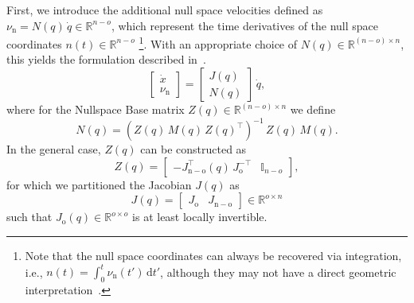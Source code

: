 First, we introduce the additional null space velocities defined as $\nu_\mathrm{n} = N(q) \, \dot{q} \in \mathbb{R}^{n-o}$, which represent the time derivatives of the null space coordinates $n(t) \in \mathbb{R}^{n-o}$ \footnote{Note that the null space coordinates can always be recovered via integration, i.e.,  $n(t) = \int_0^t \nu_\mathrm{n}(t{\prime}) \, \mathrm{d}t{\prime}$, although they may not have a direct geometric interpretation~\citep{ott2008cartesian}.}. With an appropriate choice of  $N(q) \in \mathbb{R}^{(n-o) \times n}$, this yields the formulation described in~\citep{ott2008cartesian, della2020model}.
\begin{equation}
    \begin{bmatrix}
        \dot{x}\\
        \nu_\mathrm{n}
    \end{bmatrix} = \begin{bmatrix}
        J(q)\\
        N(q)
    \end{bmatrix} \, \dot{q},
\end{equation}
where for the Nullspace Base matrix $Z(q) \in \mathbb{R}^{(n-o) \times n}$ we define~\citep{ott2008cartesian}
\begin{equation}
    N(q) = \left ( Z(q) \, M(q) \, Z(q)^\top \right )^{-1} \, Z(q) \, M(q).
\end{equation}
In the general case, $Z(q)$ can be constructed as~\citep{huang1991optimal, ott2008cartesian}
\begin{equation}
    Z(q) = \begin{bmatrix}
        -J_\mathrm{n-o}^\top(q) \, J_\mathrm{o}^{-\top} & \mathbb{I}_{n-o}
    \end{bmatrix},
\end{equation}
for which we partitioned the Jacobian $J(q)$ as 
\begin{equation}
    J(q) = \begin{bmatrix}
        J_\mathrm{o} & J_\mathrm{n-o}
    \end{bmatrix} \in \mathbb{R}^{o \times n}
\end{equation}
such that $J_\mathrm{o}(q) \in \mathbb{R}^{o \times o}$ is at least locally invertible.


